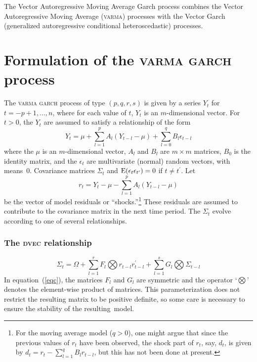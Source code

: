 %
%

The Vector Autoregressive Moving Average Garch process combines
the Vector Autoregressive Moving Average (\textsc{varma})
processes with the Vector Garch (generalized 
autoregressive conditional heteroscedastic) processes.


\section{Formulation of the \textsc{varma garch} process}

The \textsc{varma garch} process of type $(p,q,r,s)$ is given by a 
series $Y_t$ for $t=-p+1,\ldots,n$, where for each value of $t$,
$Y_t$ is an $m$-dimensional vector.
For $t>0$, the $Y_t$ are assumed to satisfy a relationship of the form
\begin{equation}
  Y_t=\mu +\sum_{l=1}^p A_l (Y_{t-l}-\mu)
    +\sum_{l=0}^q B_l \epsilon_{t-l}            
  \label{eq1}
\end{equation}
where the $\mu$ is an $m$-dimensional vector, 
$A_l$ and $B_l$ are $m\times m$ matrices, $B_0$ is the identity
matrix,  and the
$\epsilon_t$ are multivariate (normal) random vectors,
with means~$0$.  Covariance matrices $\Sigma_t$ and
 $\hbox{\rm E}(\epsilon_t\epsilon_{t^\prime})=0$ if $t\ne t^\prime$.
Let
\begin{equation}
  r_t=Y_t-\mu -\sum_{l=1}^p A_l (Y_{t-l}-\mu)
  \label{eqc1}
\end{equation}
be the vector of model residuals or ``shocks.''\footnote{For the moving
average model ($q>0$), one might argue that since the previous values
of $r_t$ have been observed, the shock part of $r_t$, say,
$d_t$, is given by $d_t=r_t-\sum_{l=1}^q B_l r_{t-l}$,
but this has not been done at present.}
These residuals are
assumed to contribute to the covariance matrix in the next time period.
The $\Sigma_t$ evolve according to one of several relationships.

\subsubsection{The \textsc{dvec} relationship}
\begin{equation}
  \Sigma_t=\Omega+
        \sum_{l=1}^r F_l\bigotimes r_{t-l}r_{t-l}^\prime  
         +\sum_{l=1}^sG_l\bigotimes \Sigma_{t-l}
  \label{eqc}
\end{equation}
In equation~(\ref{eqc}), the matrices 
$F_l$ and $G_l$ are symmetric and the operator
`$\bigotimes$' denotes the element-wise product of matrices.
This parameterization does not restrict the resulting matrix to
be positive definite, so some care is necessary to ensure the
stability of the resulting~model.

